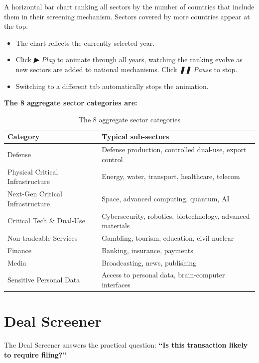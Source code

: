\documentclass[12pt,a4paper]{article}
\newcommand{\uielem}[1]{\textit{#1}}
\begin{document}
A horizontal bar chart ranking all sectors by the number of countries that include them in their screening mechanism. Sectors covered by more countries appear at the top.

\begin{itemize}
  \item The chart reflects the currently selected year.
  \item Click \uielem{▶ Play} to animate through all years, watching the ranking evolve as new sectors are added to national mechanisms. Click \uielem{❚❚ Pause} to stop.
  \item Switching to a different tab automatically stops the animation.
\end{itemize}

\textbf{The 8 aggregate sector categories are:}

\begin{table}[h]
\centering
\begin{tabularx}{\linewidth}{lX}
\toprule
\textbf{Category} & \textbf{Typical sub-sectors} \\
\midrule
Defense & Defense production, controlled dual-use, export control \\
Physical Critical Infrastructure & Energy, water, transport, healthcare, telecom \\
Next-Gen Critical Infrastructure & Space, advanced computing, quantum, AI \\
Critical Tech \& Dual-Use & Cybersecurity, robotics, biotechnology, advanced materials \\
Non-tradeable Services & Gambling, tourism, education, civil nuclear \\
Finance & Banking, insurance, payments \\
Media & Broadcasting, news, publishing \\
Sensitive Personal Data & Access to personal data, brain-computer interfaces \\
\bottomrule
\end{tabularx}
\caption{The 8 aggregate sector categories}
\end{table}

\section{Deal Screener}
\label{sec:screener}

The Deal Screener answers the practical question: \textbf{``Is this transaction likely to require filing?''}
\end{document}
